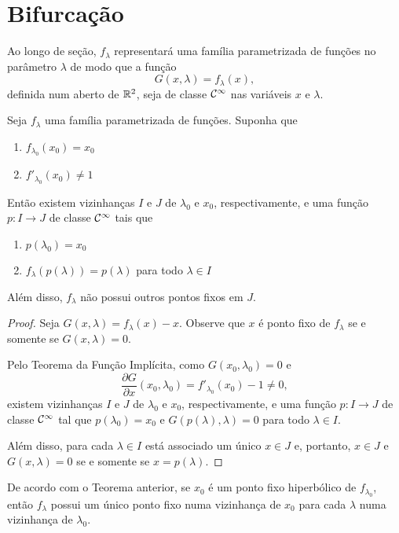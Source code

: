 \section{Bifurcação}

Ao longo de seção, $f_\lambda$ representará uma família parametrizada de funções no parâmetro $\lambda$ de modo que a função
$$G(x, \lambda) = f_\lambda(x),$$
definida num aberto de $\mathbb{R}^2$, seja de classe $\mathcal{C}^\infty$ nas variáveis $x$ e $\lambda$.

\begin{theorem}
\label{theorem1}
Seja $f_\lambda$ uma família parametrizada de funções. Suponha que \begin{enumerate}
\item $f_{\lambda_0}(x_0) = x_0$
\item $f'_{\lambda_0}(x_0) \neq 1$ 
\end{enumerate}
Então existem vizinhanças $I$ e $J$ de $\lambda_0$ e $x_0$, respectivamente, e uma função $p: I \to J$ de classe $\mathcal{C}^\infty$ tais que
\begin{enumerate}
\item $p(\lambda_0) = x_0$ 
\item $f_\lambda(p(\lambda)) = p(\lambda)$ para todo $\lambda \in I$
\end{enumerate}
Além disso, $f_\lambda$ não possui outros pontos fixos em $J$.
\end{theorem}

\begin{proof}
Seja $G(x, \lambda) = f_\lambda(x) - x$. Observe que $x$ é ponto fixo de $f_\lambda$ se e somente se $G(x, \lambda) = 0$.

Pelo Teorema da Função Implícita, como $G(x_0, \lambda_0) = 0$ e
$$\frac{\partial G}{\partial x} (x_0, \lambda_0) = f'_{\lambda_0}(x_0) - 1 \neq 0,$$
existem vizinhanças $I$ e $J$ de $\lambda_0$ e $x_0$, respectivamente, e uma função $p: I \to J$ de classe $\mathcal{C}^\infty$ tal que $p(\lambda_0) = x_0$ e $G(p(\lambda), \lambda) = 0$ para todo $\lambda \in I$.

Além disso, para cada $\lambda \in I$ está associado um único $x \in J$ e, portanto, $x \in J$ e $G(x, \lambda) = 0$ se e somente se $x = p(\lambda)$.
\end{proof}

De acordo com o Teorema anterior, se $x_0$ é um ponto fixo hiperbólico de $f_{\lambda_0}$, então $f_\lambda$ possui um único ponto fixo numa vizinhança de $x_0$ para cada $\lambda$ numa vizinhança de $\lambda_0$.
 
